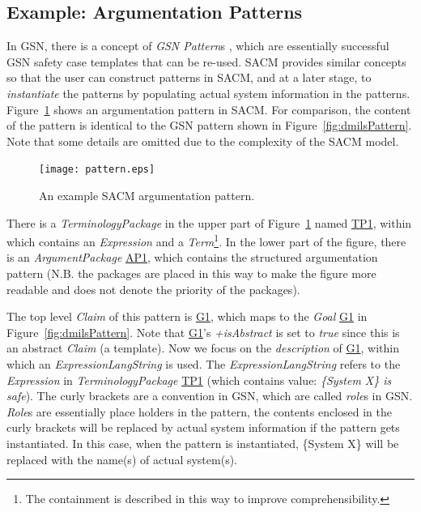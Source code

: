 \subsection{Example: Argumentation Patterns}
\label{sec:patterns}
In GSN, there is a concept of \textit{GSN Pattern}s \cite{kelly1997safety}, which are essentially successful GSN safety case templates that can be re-used. 
SACM provides similar concepts so that the user can construct patterns in SACM, and at a later stage, to \textit{instantiate} the patterns by populating actual system information in the patterns. 
Figure~\ref{fig:sacmPattern} shows an argumentation pattern in SACM. For comparison, the content of the pattern is identical to the GSN pattern shown in Figure~\ref{fig:dmilsPattern}. 
Note that some details are omitted due to the complexity of the SACM model.
\begin{figure}
	\centering
	\texttt{[image: pattern.eps]}
	\caption{An example SACM argumentation pattern.}
	\label{fig:sacmPattern}
\end{figure}

There is a \textit{TerminologyPackage} in the upper part of Figure~\ref{fig:sacmPattern} named \underline{TP1}, within which contains an \textit{Expression} and a \textit{Term}\footnote{The containment is described in this way to improve comprehensibility.}. 
In the lower part of the figure, there is an \textit{ArgumentPackage} \underline{AP1}, which contains the structured argumentation pattern (N.B. the packages are placed in this way to make the figure more readable and does not denote the priority of the packages).

The top level \textit{Claim} of this pattern is \underline{G1}, which maps to the \textit{Goal} \underline{G1} in Figure~\ref{fig:dmilsPattern}. 
Note that \underline{G1}'s \textit{+isAbstract} is set to \textit{true} since this is an abstract \textit{Claim} (a template). 
Now we focus on the \textit{description} of \underline{G1}, within which an \textit{ExpressionLangString} is used. 
The \textit{ExpressionLangString} refers to the \textit{Expression} in \textit{TerminologyPackage} \underline{TP1} (which contains value: \textit{\{System X\} is safe}). 
The curly brackets are a convention in GSN, which are called \textit{role}s in GSN. 
\textit{Role}s are essentially place holders in the pattern, the contents enclosed in the curly brackets will be replaced by actual system information if the pattern gets instantiated. 
In this case, when the pattern is instantiated, \{System X\} will be replaced with the name(s) of actual system(s). 

